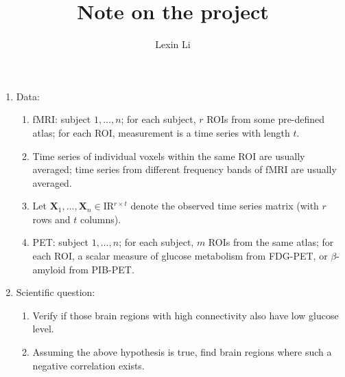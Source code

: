 \documentclass[11pt]{article}
\title{Note on the project}
\author{Lexin Li}
\newcommand{\real}[1]{\mathrm{I \! R} \mathit{^{#1}}}
\newcommand{\Xbf}{{\bm X}}
\begin{document}
\maketitle


\begin{enumerate}
\item Data:
\begin{enumerate}[(1)]
\item fMRI: subject $1, \ldots, n$; for each subject, $r$ ROIs from some pre-defined atlas; for each ROI, measurement is a time series with length $t$.
\item Time series of individual voxels within the same ROI are usually averaged; time series from different frequency bands of fMRI are usually averaged. 
\item Let $\Xbf_1, \ldots, \Xbf_n \in \real{r \times t}$ denote the observed time series matrix (with $r$ rows and $t$ columns).
\item PET: subject $1, \ldots, n$; for each subject, $m$ ROIs from the same atlas; for each ROI, a scalar measure of glucose metabolism from FDG-PET, or $\beta$-amyloid from PIB-PET.
\end{enumerate}

\item Scientific question:
\begin{enumerate}[(1)]
\item Verify if those brain regions with high connectivity also have low glucose level. 
\item Assuming the above hypothesis is true, find brain regions where such a negative correlation exists. 
\end{enumerate}


\end{enumerate}
\end{document}
